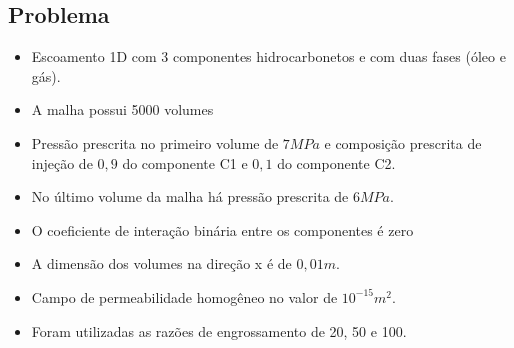 \documentclass[professionalfont]{beamer}
\begin{document}
\subsection{Problema \theproblem}

\begin{frame}{\FrameProblemName}
    \begin{itemize}
        \item Escoamento 1D com 3 componentes hidrocarbonetos e com duas fases (óleo e gás). 
        \item A malha possui 5000 volumes 
        \item Pressão prescrita no primeiro volume de $7MPa$ e composição prescrita de injeção de $0,9$ do componente C1 e $0,1$ do componente C2. 
        \item No último volume da malha há pressão prescrita de $6MPa$. 
        \item O coeficiente de interação binária entre os componentes é zero 
        \item A dimensão dos volumes na direção x é de $0,01m$. 
        \item Campo de permeabilidade homogêneo no valor de $10^{-15} m^{2}$.
        \item Foram utilizadas as razões de engrossamento de 20, 50 e 100.
    \end{itemize}
\end{frame}
\end{document}
